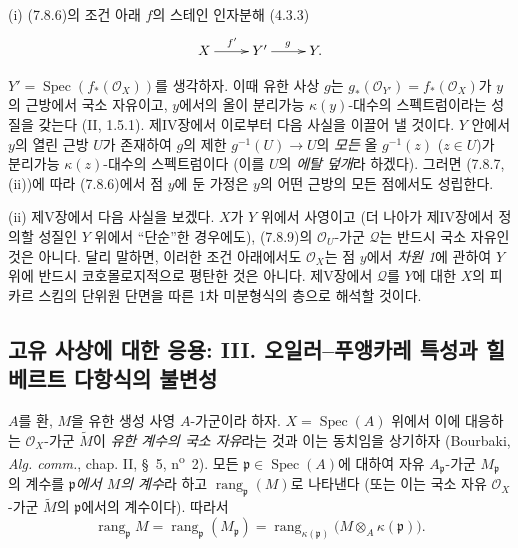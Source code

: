 \begin{remarks}[7.8.10]
\textnormal{(i)} (7.8.6)의 조건 아래 $f$의 스테인 인자분해 (4.3.3)
\[
\xymatrix{
  X \ar[r]^{f'} & Y' \ar[r]^{g} & Y .
}
\]

$Y'=\operatorname{Spec}(f_*(\mathscr O_X))$를 생각하자. 이때 유한 사상
$g$는 $g_*(\mathscr O_{Y'})=f_*(\mathscr O_X)$가 $y$의 근방에서 국소
자유이고, $y$에서의 올이 분리가능 $\kappa(y)$-대수의 스펙트럼이라는
성질을 갖는다 (II, 1.5.1). 제IV장에서 이로부터 다음 사실을 이끌어 낼
것이다. $Y$ 안에서 $y$의 열린 근방 $U$가 존재하여 $g$의 제한
$g^{-1}(U)\to U$의 \emph{모든} 올 $g^{-1}(z)$ ($z\in U$)가 분리가능
$\kappa(z)$-대수의 스펙트럼이다 (이를 $U$의 \emph{에탈 덮개}라 하겠다).
그러면 (7.8.7, (ii))에 따라 (7.8.6)에서 점 $y$에 둔 가정은 $y$의 어떤
근방의 모든 점에서도 성립한다.

\medskip
\textnormal{(ii)} 제V장에서 다음 사실을 보겠다. $X$가 $Y$ 위에서
사영이고 (더 나아가 제IV장에서 정의할 성질인 $Y$ 위에서 ``단순''한
경우에도), (7.8.9)의 $\mathscr O_U$-가군 $\mathscr Q$는 반드시 국소
자유인 것은 아니다. 달리 말하면, 이러한 조건 아래에서도
$\mathscr O_X$는 점 $y$에서 \emph{차원 1}에 관하여 $Y$ 위에 반드시
코호몰로지적으로 평탄한 것은 아니다. 제V장에서 $\mathscr Q$를 $Y$에
대한 $X$의 피카르 스킴의 단위원 단면을 따른 1차 미분형식의 층으로
해석할 것이다.
\end{remarks}

\subsection{고유 사상에 대한 응용: III. 오일러--푸앵카레 특성과
힐베르트 다항식의 불변성}
\label{subsection:III.7.9.fr}
\label{III.7.9.fr}

\begin{env}[7.9.1]
\label{III.7.9.1.fr}
$A$를 환, $M$을 유한 생성 사영 $A$-가군이라 하자. $X=\operatorname{Spec}(A)$
위에서 이에 대응하는 $\mathscr O_X$-가군 $\widetilde M$이 \emph{유한
계수의 국소 자유}라는 것과 이는 동치임을 상기하자 (Bourbaki,
\emph{Alg. comm.}, chap. II, \S~5, n\textsuperscript{o}~2).
모든 $\mathfrak p\in\operatorname{Spec}(A)$에 대하여 자유
$A_{\mathfrak p}$-가군 $M_{\mathfrak p}$의 계수를 \emph{$\mathfrak p$에서
$M$의 계수}라 하고 $\operatorname{rang}_{\mathfrak p}(M)$로 나타낸다
(또는 이는 국소 자유 $\mathscr O_X$-가군 $\widetilde M$의
$\mathfrak p$에서의 계수이다). 따라서
\[
  \operatorname{rang}_{\mathfrak p}M
  =\operatorname{rang}_{\mathfrak p}(M_{\mathfrak p})
  =\operatorname{rang}_{\kappa(\mathfrak p)}
  \bigl(M\otimes_A\kappa(\mathfrak p)\bigr).
  \tag{7.9.1.1}\label{III.7.9.1.1.fr}
\]
\end{env}


